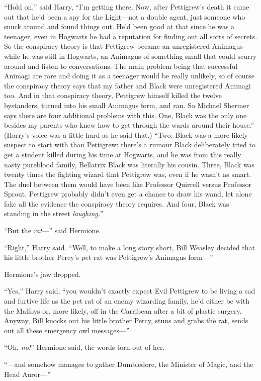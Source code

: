 “Hold on,” said Harry, “I’m getting there. Now, after Pettigrew’s death it came out that he’d been a spy for the Light—not a double agent, just someone who snuck around and found things out. He’d been good at that since he was a teenager, even in Hogwarts he had a reputation for finding out all sorts of secrets. So the conspiracy theory is that Pettigrew became an unregistered Animagus while he was still in Hogwarts, an Animagus of something small that could scurry around and listen to conversations. The main problem being that successful Animagi are rare and doing it as a teenager would be really unlikely, so of course the conspiracy theory says that my father and Black were unregistered Animagi too. And in that conspiracy theory, Pettigrew himself killed the twelve bystanders, turned into his small Animagus form, and ran. So Michael Shermer says there are four additional problems with this. One, Black was the only one besides my parents who knew how to get through the wards around their house.” (Harry’s voice was a little hard as he said that.) “Two, Black was a more likely suspect to start with than Pettigrew: there’s a rumour Black deliberately tried to get a student killed during his time at Hogwarts, and he was from this really nasty pureblood family, Bellatrix Black was literally his cousin. Three, Black was twenty times the fighting wizard that Pettigrew was, even if he wasn’t as smart. The duel between them would have been like Professor Quirrell versus Professor Sprout. Pettigrew probably didn’t even get a chance to draw his wand, let alone fake all the evidence the conspiracy theory requires. And four, Black was standing in the street \emph{laughing.}”

“But the \emph{rat}—” said Hermione.

“Right,” Harry said. “Well, to make a long story short, Bill Weasley decided that his little brother Percy’s pet rat was Pettigrew’s Animagus form—”

Hermione’s jaw dropped.

“Yes,” Harry said, “you wouldn’t exactly expect Evil Pettigrew to be living a sad and furtive life as the pet rat of an enemy wizarding family, he’d either be with the Malfoys or, more likely, off in the Carribean after a bit of plastic surgery. Anyway, Bill knocks out his little brother Percy, stuns and grabs the rat, sends out all these emergency owl messages—”

“Oh, \emph{no!}” Hermione said, the words torn out of her.

“—and somehow manages to gather Dumbledore, the Minister of Magic, and the Head Auror—”

